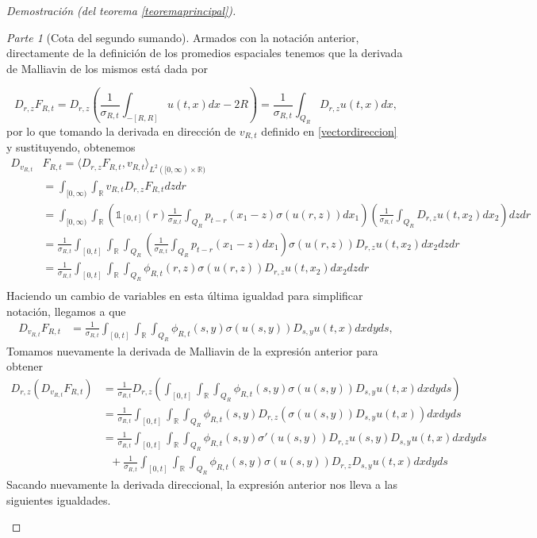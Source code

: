 \documentclass[letterpaper,twoside,12pt]{book}
\newcommand{\R}{\mathbb{R}}
\newcommand{\1}{\mathds{1}}
\theoremstyle{definition}
\theoremstyle{definition}
\theoremstyle{remark}
\newtheorem{proofpart}{Parte}
\theoremstyle{definition}
\theoremstyle{definition}
\theoremstyle{definition}
\theoremstyle{definition}
\theoremstyle{definition}
\begin{document}
\begin{proof}[Demostración (del teorema \ref{teoremaprincipal})]
\begin{proofpart}[Cota del segundo sumando]
Armados con la notación anterior, directamente de la definición de los promedios espaciales tenemos que la derivada de Malliavin de los mismos está dada por 

\[
   D_{r,z}F_{R,t}=D_{r,z}\left(\frac{1}{\sigma_{R,t}}\int_{-[R,R]}u(t,x)dx-2R\right)=\frac{1}{\sigma_{R,t}}\int_{Q_R}D_{r,z}u(t,x)dx,
\]
por lo que tomando la derivada en dirección de $v_{R,t}$ definido en \eqref{vectordireccion} y sustituyendo, obtenemos 
\begin{align*}
   D_{v_{R,t}}&F_{R,t}=\langle D_{r,z}F_{R,t},v_{R,t}\rangle_{L^{2}([0,\infty)\times\R)}\\
   &=\int_{[0,\infty)}\int_\R v_{R,t}D_{r,z}F_{R,t}dz dr\\
   &=\int_{[0,\infty)}\int_\R\left(\1_{[0,t]}(r)\frac{1}{\sigma_{R,t}}\int_{Q_R}p_{t-r}(x_1-z)\sigma(u(r,z))dx_1\right)\left(\frac{1}{\sigma_{R,t}}\int_{Q_R}D_{r,z}u(t,x_2)dx_2\right) dz dr\\
   &=\frac{1}{\sigma_{R,t}}\int_{[0,t]}\int_\R \int_{Q_R}\left(\frac{1}{\sigma_{R,t}}\int_{Q_R}p_{t-r}(x_1-z)dx_1\right)\sigma(u(r,z))D_{r,z}u(t,x_2) dx_2dz dr\\
   &=\frac{1}{\sigma_{R,t}}\int_{[0,t]}\int_\R \int_{Q_R}\phi_{R,t}(r,z)\sigma(u(r,z))D_{r,z}u(t,x_2) dx_2dz dr\\
\end{align*}
Haciendo un cambio de variables en esta última igualdad para simplificar notación, llegamos a que
\begin{align*}
D_{v_{R,t}}F_{R,t}&=\frac{1}{\sigma_{R,t}}\int_{[0,t]}\int_\R \int_{Q_R}\phi_{R,t}(s,y)\sigma(u(s,y))D_{s,y}u(t,x) dx dy ds,
\end{align*}
 Tomamos nuevamente la derivada de Malliavin de la expresión anterior para obtener 
\begin{align*}
   D_{r,z}(D_{v_{R,t}}F_{R,t})&=\frac{1}{\sigma_{R,t}}D_{r,z}\left(\int_{[0,t]}\int_\R \int_{Q_R}\phi_{R,t}(s,y)\sigma(u(s,y))D_{s,y}u(t,x) dx dy ds\right)\\
   &=\frac{1}{\sigma_{R,t}}\int_{[0,t]}\int_\R \int_{Q_R}\phi_{R,t}(s,y)D_{r,z}\left(\sigma(u(s,y))D_{s,y}u(t,x)\right) dx dy ds\\
   &=\frac{1}{\sigma_{R,t}}\int_{[0,t]}\int_\R \int_{Q_R}\phi_{R,t}(s,y)\sigma'(u(s,y))D_{r,z}u(s,y)D_{s,y}u(t,x)dx dy ds\\
   & \ \ \ +\frac{1}{\sigma_{R,t}}\int_{[0,t]}\int_\R \int_{Q_R}\phi_{R,t}(s,y)\sigma(u(s,y))D_{r,z}D_{s,y}u(t,x)dx dy ds
\end{align*}
Sacando nuevamente la derivada direccional, la expresión anterior nos lleva a las siguientes igualdades.

\end{proofpart}
\end{proof}
\end{document}

